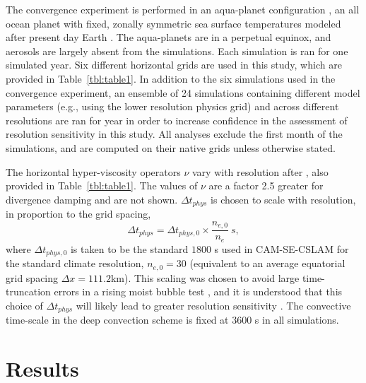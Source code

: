 \documentclass[times]{qjrms4}
\begin{document}
The convergence experiment is performed in an aqua-planet configuration \citep{NH2000ASL,MWO2016JAMES}, an all ocean planet with fixed, zonally symmetric sea surface temperatures modeled after present day Earth \citep[$QOBS$ in][]{NH2000ASL}. The aqua-planets are in a perpetual equinox, and aerosols are largely absent from the simulations. Each simulation is ran for one simulated year. Six different horizontal grids are used in this study, which are provided in Table~\ref{tbl:table1}. In addition to the six simulations used in the convergence experiment, an ensemble of 24 simulations containing different model parameters (e.g., using the lower resolution physics grid) and across different resolutions are ran for year in order to increase confidence in the assessment of resolution sensitivity in this study. All analyses exclude the first month of the simulations, and are computed on their native grids unless otherwise stated.

The horizontal hyper-viscosity operators $\nu$ vary with resolution after \cite{HETAL2019JAMES}, also provided in Table~\ref{tbl:table1}. The values of $\nu$ are a factor 2.5 greater for divergence damping and are not shown. $\Delta t_{phys}$ is chosen to scale with resolution, in proportion to the grid spacing,
\begin{equation}
\Delta t_{phys} = \Delta t_{phys,0} \times \frac{n_{e,0}}{n_e}~s,\label{eq:dt-scale}
\end{equation}
where $\Delta t_{phys,0}$ is taken to be the standard $1800$ s used in CAM-SE-CSLAM for the standard climate resolution, $n_{e,0} = 30$ (equivalent to an average equatorial grid spacing $\Delta x = 111.2$km). This scaling was chosen to avoid large time-truncation errors in a rising moist bubble test \citep[Appendix A in][]{HETAL2019JAMES}, and it is understood that this choice of $\Delta t_{phys}$ will likely lead to greater resolution sensitivity \citep{W2008TELLUS}. The convective time-scale in the deep convection scheme is fixed at 3600 s in all simulations.
 
 \section{Results}
 
\end{document}
